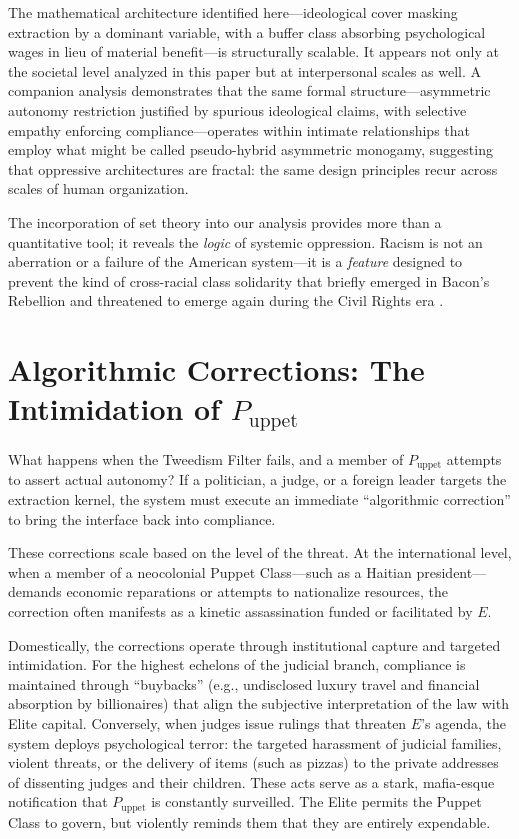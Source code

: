 \documentclass[12pt,openany]{book}
\begin{document}
The mathematical architecture identified here---ideological cover masking extraction by a dominant variable, with a buffer class absorbing psychological wages in lieu of material benefit---is structurally scalable. It appears not only at the societal level analyzed in this paper but at interpersonal scales as well. A companion analysis demonstrates that the same formal structure---asymmetric autonomy restriction justified by spurious ideological claims, with selective empathy enforcing compliance---operates within intimate relationships that employ what might be called pseudo-hybrid asymmetric monogamy, suggesting that oppressive architectures are fractal: the same design principles recur across scales of human organization.

The incorporation of set theory into our analysis provides more than a quantitative tool; it reveals the \textit{logic} of systemic oppression. Racism is not an aberration or a failure of the American system---it is a \textit{feature} designed to prevent the kind of cross-racial class solidarity that briefly emerged in Bacon's Rebellion and threatened to emerge again during the Civil Rights era \cite{robinson, allen, bonillasilva}.

\section{Algorithmic Corrections: The Intimidation of \texorpdfstring{$P_{\text{uppet}}$}{P\_uppet}}

What happens when the Tweedism Filter fails, and a member of $P_{\text{uppet}}$ attempts to assert actual autonomy? If a politician, a judge, or a foreign leader targets the extraction kernel, the system must execute an immediate ``algorithmic correction'' to bring the interface back into compliance.

These corrections scale based on the level of the threat. At the international level, when a member of a neocolonial Puppet Class---such as a Haitian president---demands economic reparations or attempts to nationalize resources, the correction often manifests as a kinetic assassination funded or facilitated by $E$.

Domestically, the corrections operate through institutional capture and targeted intimidation. For the highest echelons of the judicial branch, compliance is maintained through ``buybacks'' (e.g., undisclosed luxury travel and financial absorption by billionaires) that align the subjective interpretation of the law with Elite capital. Conversely, when judges issue rulings that threaten $E$'s agenda, the system deploys psychological terror: the targeted harassment of judicial families, violent threats, or the delivery of items (such as pizzas) to the private addresses of dissenting judges and their children. These acts serve as a stark, mafia-esque notification that $P_{\text{uppet}}$ is constantly surveilled. The Elite permits the Puppet Class to govern, but violently reminds them that they are entirely expendable.
\end{document}
